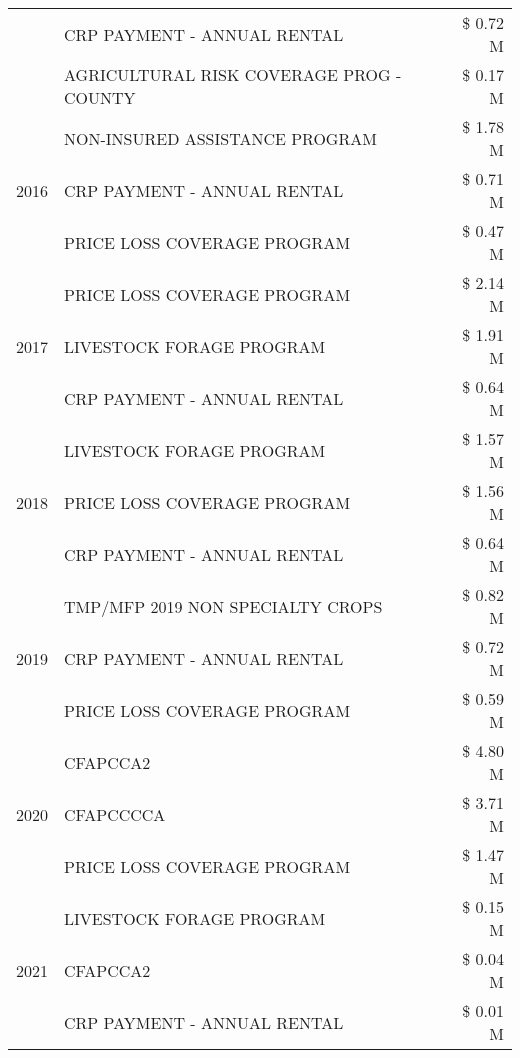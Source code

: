 \begin{tabular}{llr}
 & CRP PAYMENT - ANNUAL RENTAL & \$ 0.72 M \\
 & AGRICULTURAL RISK COVERAGE PROG - COUNTY & \$ 0.17 M \\
\cline{1-3}
\multirow[t]{3}{*}{2016} & NON-INSURED ASSISTANCE PROGRAM & \$ 1.78 M \\
 & CRP PAYMENT - ANNUAL RENTAL & \$ 0.71 M \\
 & PRICE LOSS COVERAGE PROGRAM & \$ 0.47 M \\
\cline{1-3}
\multirow[t]{3}{*}{2017} & PRICE LOSS COVERAGE PROGRAM & \$ 2.14 M \\
 & LIVESTOCK FORAGE PROGRAM & \$ 1.91 M \\
 & CRP PAYMENT - ANNUAL RENTAL & \$ 0.64 M \\
\cline{1-3}
\multirow[t]{3}{*}{2018} & LIVESTOCK FORAGE PROGRAM & \$ 1.57 M \\
 & PRICE LOSS COVERAGE PROGRAM & \$ 1.56 M \\
 & CRP PAYMENT - ANNUAL RENTAL & \$ 0.64 M \\
\cline{1-3}
\multirow[t]{3}{*}{2019} & TMP/MFP 2019 NON SPECIALTY CROPS & \$ 0.82 M \\
 & CRP PAYMENT - ANNUAL RENTAL & \$ 0.72 M \\
 & PRICE LOSS COVERAGE PROGRAM & \$ 0.59 M \\
\cline{1-3}
\multirow[t]{3}{*}{2020} & CFAPCCA2 & \$ 4.80 M \\
 & CFAPCCCCA & \$ 3.71 M \\
 & PRICE LOSS COVERAGE PROGRAM & \$ 1.47 M \\
\cline{1-3}
\multirow[t]{3}{*}{2021} & LIVESTOCK FORAGE PROGRAM & \$ 0.15 M \\
 & CFAPCCA2 & \$ 0.04 M \\
 & CRP PAYMENT - ANNUAL RENTAL & \$ 0.01 M \\
\cline{1-3}
\bottomrule
\end{tabular}
